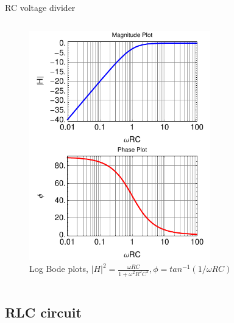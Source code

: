 \begin{frame}{RC voltage divider}
\begin{columns}
\begin{column}{0.5\textwidth}
\begin{figure}
  			\includegraphics[width=0.7\textwidth]{bodepa_log.pdf}
  			\caption{Log Bode plots, $|H|^2=\frac{\omega R C}{1+\omega^2 R^2 C^2},\phi=tan^{-1}(1/\omega RC)$}
  			\label{fig:bodepa_log}
			\end{figure}
		\end{column}
	\end{columns}
\end{frame}
\subsection{RLC circuit}

